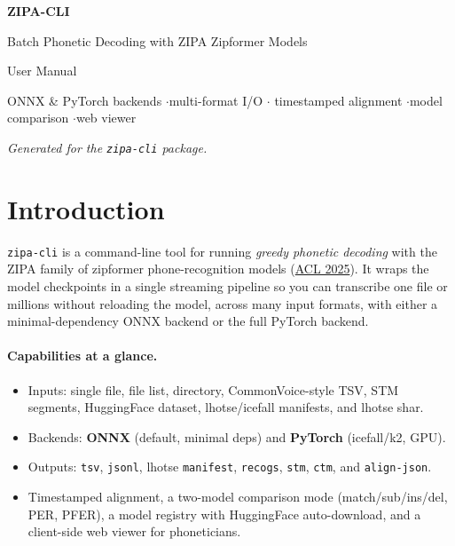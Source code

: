 \documentclass[11pt,a4paper]{article}
\newcommand{\cli}{\texttt{zipa-cli}}
\newcommand{\code}[1]{\texttt{#1}}
\begin{document}
\begin{titlepage}
\centering
\vspace*{3cm}
{\Huge\bfseries ZIPA-CLI\par}
\vspace{0.6cm}
{\Large Batch Phonetic Decoding with ZIPA Zipformer Models\par}
\vspace{0.4cm}
{\large User Manual\par}
\vfill
{\large ONNX \& PyTorch backends \quad$\cdot$\quad multi-format I/O \quad$\cdot$\quad
timestamped alignment \quad$\cdot$\quad model comparison \quad$\cdot$\quad web viewer\par}
\vspace{2cm}
{\itshape Generated for the \cli{} package.\par}
\end{titlepage}

\tableofcontents
\newpage

\section{Introduction}
\cli{} is a command-line tool for running \emph{greedy phonetic decoding} with the
ZIPA family of zipformer phone-recognition models
(\href{https://aclanthology.org/2025.acl-long.961/}{ACL 2025}). It wraps the model
checkpoints in a single streaming pipeline so you can transcribe one file or millions
without reloading the model, across many input formats, with either a
minimal-dependency ONNX backend or the full PyTorch backend.

\paragraph{Capabilities at a glance.}
\begin{itemize}[nosep]
  \item Inputs: single file, file list, directory, CommonVoice-style TSV, STM
        segments, HuggingFace dataset, lhotse/icefall manifests, and lhotse shar.
  \item Backends: \textbf{ONNX} (default, minimal deps) and \textbf{PyTorch}
        (icefall/k2, GPU).
  \item Outputs: \code{tsv}, \code{jsonl}, lhotse \code{manifest}, \code{recogs},
        \code{stm}, \code{ctm}, and \code{align-json}.
  \item Timestamped alignment, a two-model comparison mode (match/sub/ins/del, PER,
        PFER), a model registry with HuggingFace auto-download, and a client-side web
        viewer for phoneticians.
\end{itemize}
\end{document}
